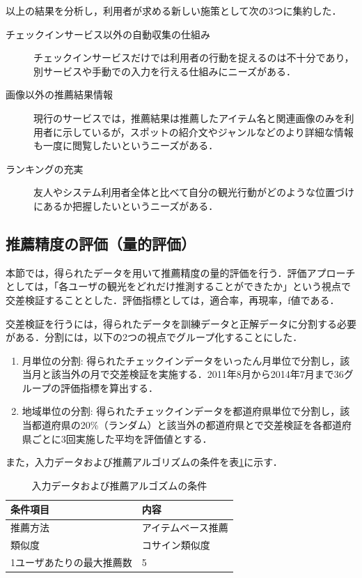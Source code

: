 \documentclass{jsarticle}
\begin{document}
以上の結果を分析し，利用者が求める新しい施策として次の3つに集約した．

\begin{description}
\item[チェックインサービス以外の自動収集の仕組み] チェックインサービスだけでは利用者の行動を捉えるのは不十分であり，別サービスや手動での入力を行える仕組みにニーズがある．
\item[画像以外の推薦結果情報] 現行のサービスでは，推薦結果は推薦したアイテム名と関連画像のみを利用者に示しているが，スポットの紹介文やジャンルなどのより詳細な情報も一度に閲覧したいというニーズがある．
\item[ランキングの充実] 友人やシステム利用者全体と比べて自分の観光行動がどのような位置づけにあるか把握したいというニーズがある．
\end{description}

\subsection{推薦精度の評価（量的評価）}

本節では，得られたデータを用いて推薦精度の量的評価を行う．評価アプローチとしては，「各ユーザの観光をどれだけ推測することができたか」という視点で交差検証することとした．評価指標としては，適合率，再現率，f値である．

交差検証を行うには，得られたデータを訓練データと正解データに分割する必要がある．分割には，以下の2つの視点でグループ化することにした．

\begin{enumerate}
\item 月単位の分割: 得られたチェックインデータをいったん月単位で分割し，該当月と該当外の月で交差検証を実施する．2011年8月から2014年7月まで36グループの評価指標を算出する．
\item 地域単位の分割: 得られたチェックインデータを都道府県単位で分割し，該当都道府県の20\%（ランダム）と該当外の都道府県とで交差検証を各都道府県ごとに3回実施した平均を評価値とする．
\end{enumerate}

また，入力データおよび推薦アルゴリズムの条件を表\ref{recommendation_condition}に示す．

\begin{table}[ht!]
\small
\caption{入力データおよび推薦アルゴズムの条件}
\begin{center}
\begin{tabular}{ll}
\label{recommendation_condition}
条件項目    & 内容 \\ \hline
推薦方法    & アイテムベース推薦 \\
類似度      & コサイン類似度 \\
1ユーザあたりの最大推薦数 & 5 \\
\end{tabular}
\end{center}
\end{table}
\end{document}
